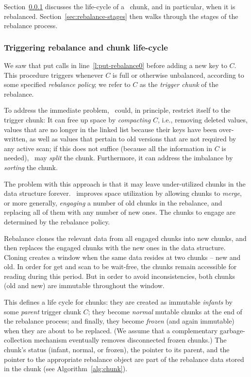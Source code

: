Section~\ref{sec:rebalance-trigger} discusses the life-cycle of a \kiwi\ chunk, and in particular,
when it is rebalanced. Section~\ref{sec:rebalance-stages} then walks through the stages of the rebalance process.

\subsubsection{Triggering rebalance and chunk life-cycle}
\label{sec:rebalance-trigger}

We saw that put calls  in line~\ref{l:put-rebalance0}  before adding a new key to $C$.
This procedure triggers  whenever $C$ is full or otherwise unbalanced, according
to some specified \emph{rebalance policy}; we refer to $C$ as the \emph{trigger chunk} of the rebalance.

To address the immediate problem, \kiwi\ could, in principle, restrict itself to the trigger chunk:
It can free up space by \emph{compacting} $C$, i.e., removing deleted values, values that are no longer in the linked list
because their keys have been over-written, as well as values that pertain to old versions that are not required by any active scan;
if this does not suffice (because all the information in $C$ is needed), \kiwi\ may \emph{split} the chunk.
Furthermore, it can address the imbalance  by \emph{sorting} the chunk.

The problem with this approach is that it may leave under-utilized chunks in the data structure forever.
\kiwi\ improves space utilization by allowing chunks to \emph{merge}, or more generally,
\emph{engaging} a number of old chunks in the rebalance,
and replacing all of them with any number of new ones.
The chunks to engage are determined by the rebalance policy.

Rebalance clones the relevant data from all engaged chunks  into new chunks, and then
replaces the engaged chunks with the new ones in the data structure.
Cloning creates a window when the same data resides at two chunks -- new and old.
In order for get and scan to be wait-free, the chunks remain accessible for reading during this period.
But in order to avoid inconsistencies, both chunks (old and new) are immutable throughout the window.

This defines a life cycle for chunks: they are created as immutable \emph{infants} by some \emph{parent} trigger chunk $C$;
they become \emph{normal} mutable chunks at the end of the rebalance process; and finally, they become \emph{frozen}
(and again immutable) when they are about to be replaced.
(We assume that a complementary garbage-collection mechanism eventually removes disconnected frozen chunks.)
The chunk's status (infant, normal, or frozen), the pointer to its parent, and the pointer to the appropriate rebalance object are part of the rebalance data
stored in the chunk (see Algorithm~\ref{alg:chunk}).



